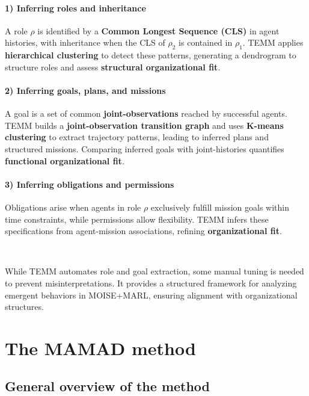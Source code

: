 \documentclass[pdflatex,sn-mathphys-num]{sn-jnl}%
\theoremstyle{thmstyleone}%
\theoremstyle{thmstyletwo}%
\theoremstyle{thmstylethree}%
\begin{document}
\paragraph{\textbf{1) Inferring roles and inheritance}}
A role $\rho$ is identified by a \textbf{Common Longest Sequence (CLS)} in agent histories, with inheritance when the CLS of $\rho_2$ is contained in $\rho_1$. TEMM applies \textbf{hierarchical clustering} to detect these patterns, generating a dendrogram to structure roles and assess \textbf{structural organizational fit}.

\paragraph{\textbf{2) Inferring goals, plans, and missions}}
A goal is a set of common \textbf{joint-observations} reached by successful agents. TEMM builds a \textbf{joint-observation transition graph} and uses \textbf{K-means clustering} to extract trajectory patterns, leading to inferred plans and structured missions. Comparing inferred goals with joint-histories quantifies \textbf{functional organizational fit}.

\paragraph{\textbf{3) Inferring obligations and permissions}}
Obligations arise when agents in role $\rho$ exclusively fulfill mission goals within time constraints, while permissions allow flexibility. TEMM infers these specifications from agent-mission associations, refining \textbf{organizational fit}.

\

While TEMM automates role and goal extraction, some manual tuning is needed to prevent misinterpretations. It provides a structured framework for analyzing emergent behaviors in MOISE+MARL, ensuring alignment with organizational structures.

\clearpage

\section{The MAMAD method}\label{sec:mamad}



\subsection{General overview of the method}
\end{document}
